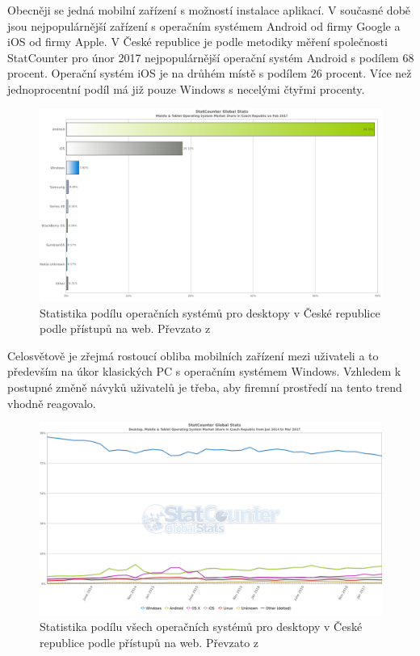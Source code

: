  Obecněji se jedná mobilní zařízení s možností instalace aplikací. V současné době jsou nejpopulárnější zařízení s operačním systémem Android od firmy Google a iOS od firmy Apple. V České republice je podle metodiky měření společnosti StatCounter pro únor 2017 nejpopulárnější operační systém Android s podílem 68 procent. Operační systém iOS je na drůhém místě s podílem 26 procent. Více než jednoprocentní podíl má již pouze Windows s necelými čtyřmi procenty. 
 
 \begin{figure}[h]
\includegraphics[width=13cm]{img/StatCounter_MobileBar}
\caption{Statistika podílu operačních systémů pro desktopy v České republice podle přístupů na web. Převzato z \cite{http://gs.statcounter.com/os-market-share/mobile-tablet/czech-republic/}} 
\centering
\end{figure}
 
Celosvětově je zřejmá rostoucí obliba mobilních zařízení mezi uživateli a to především na úkor klasických PC s operačním systémem Windows. Vzhledem k postupné změně návyků uživatelů je třeba, aby firemní prostředí na tento trend vhodně reagovalo. 


\begin{figure}[h]
\includegraphics[width=13cm]{img/StatCounter_VyvojVse}
\caption{Statistika podílu všech operačních systémů pro desktopy v České republice podle přístupů na web. Převzato z \cite{http://gs.statcounter.com/os-market-share/mobile-tablet/czech-republic/}} 
\centering
\end{figure}

